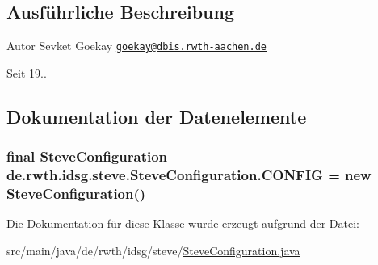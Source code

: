 \subsection{Ausführliche Beschreibung}
\begin{DoxyAuthor}{Autor}
Sevket Goekay \href{mailto:goekay@dbis.rwth-aachen.de}{\tt goekay@dbis.\+rwth-\/aachen.\+de} 
\end{DoxyAuthor}
\begin{DoxySince}{Seit}
19.. 
\end{DoxySince}


\subsection{Dokumentation der Datenelemente}
\hypertarget{classde_1_1rwth_1_1idsg_1_1steve_1_1_steve_configuration_ac544b11e403f400330d7b210c2c6c2a8}{
\subsubsection[{C\+O\+N\+F\+I\+G}]{\setlength{\rightskip}{0pt plus 5cm}final {\bf Steve\+Configuration} de.\+rwth.\+idsg.\+steve.\+Steve\+Configuration.\+C\+O\+N\+F\+I\+G = new {\bf Steve\+Configuration}()\hspace{0.3cm}{\ttfamily [static]}}}\label{classde_1_1rwth_1_1idsg_1_1steve_1_1_steve_configuration_ac544b11e403f400330d7b210c2c6c2a8}


Die Dokumentation für diese Klasse wurde erzeugt aufgrund der Datei\+:\begin{DoxyCompactItemize}
\item 
src/main/java/de/rwth/idsg/steve/\hyperlink{_steve_configuration_8java}{Steve\+Configuration.\+java}\end{DoxyCompactItemize}
